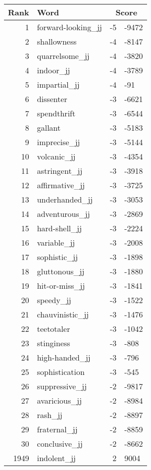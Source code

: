 \begin{longtable}[!htbp]{| rlr@{.}l |}
    \hline
    \textbf{Rank} & \textbf{Word} & \multicolumn{2}{c|}{\textbf{Score}} \\
    \hline
    \endhead
    1 & forward-looking\_jj & -5 & -9472 \\
    2 & shallowness & -4 & -8147 \\
    3 & quarrelsome\_jj & -4 & -3820 \\
    4 & indoor\_jj & -4 & -3789 \\
    5 & impartial\_jj & -4 & -91 \\
    6 & dissenter & -3 & -6621 \\
    7 & spendthrift & -3 & -6544 \\
    8 & gallant & -3 & -5183 \\
    9 & imprecise\_jj & -3 & -5144 \\
    10 & volcanic\_jj & -3 & -4354 \\
    11 & astringent\_jj & -3 & -3918 \\
    12 & affirmative\_jj & -3 & -3725 \\
    13 & underhanded\_jj & -3 & -3053 \\
    14 & adventurous\_jj & -3 & -2869 \\
    15 & hard-shell\_jj & -3 & -2224 \\
    16 & variable\_jj & -3 & -2008 \\
    17 & sophistic\_jj & -3 & -1898 \\
    18 & gluttonous\_jj & -3 & -1880 \\
    19 & hit-or-miss\_jj & -3 & -1841 \\
    20 & speedy\_jj & -3 & -1522 \\
    21 & chauvinistic\_jj & -3 & -1476 \\
    22 & teetotaler & -3 & -1042 \\
    23 & stinginess & -3 & -808 \\
    24 & high-handed\_jj & -3 & -796 \\
    25 & sophistication & -3 & -545 \\
    26 & suppressive\_jj & -2 & -9817 \\
    27 & avaricious\_jj & -2 & -8984 \\
    28 & rash\_jj & -2 & -8897 \\
    29 & fraternal\_jj & -2 & -8859 \\
    30 & conclusive\_jj & -2 & -8662 \\
    1949 & indolent\_jj & 2 & 9004 \\

\end{longtable}
